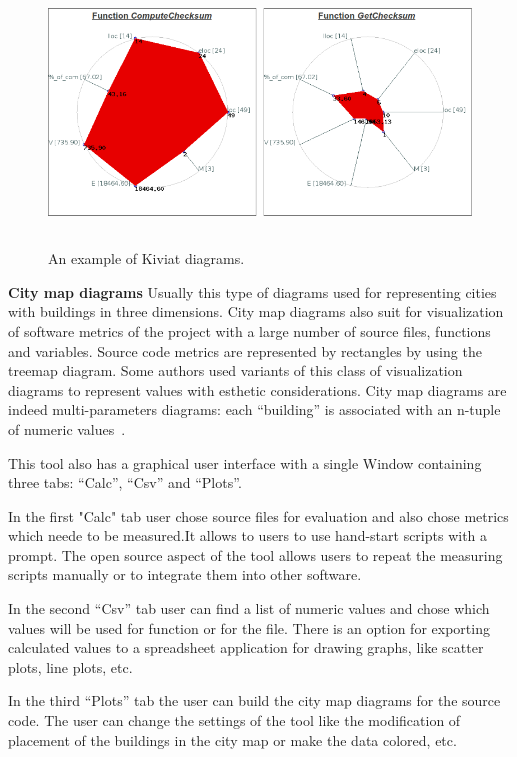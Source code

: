 \begin{figure}[h]
	\centering
	\includegraphics[height=70mm]{figures/metrix.png}
	\caption{An example of Kiviat diagrams.}
	\label{fig:metrix}
\end{figure}

\textbf{City map diagrams}
Usually this type of diagrams used for representing cities with buildings in three dimensions. City map diagrams also suit for visualization of software metrics of the project with a large number of source files, functions and variables. Source code metrics are represented by rectangles by using the treemap diagram. Some authors used variants of this class of visualization diagrams to represent  values with esthetic considerations. City map diagrams are indeed multi-parameters diagrams: each “building” is associated with an n-tuple of numeric values~\cite{metrix}.  

This tool also has a graphical user interface with a single Window containing three tabs: “Calc”, “Csv” and “Plots”.

In the first "Calc" tab user chose source files for evaluation and also chose metrics which neede to be measured.It allows to users to use  hand-start scripts with a prompt. The open source aspect of the tool allows users to repeat the measuring scripts manually or to integrate them into other software.

In the second “Csv” tab user can find a list of numeric values and chose which values will be used for function or for the file. There is an option for exporting calculated values to a spreadsheet application for drawing graphs, like scatter plots, line plots, etc.

In the third “Plots” tab the user can build the city map diagrams for the source code. The user can change the settings of the tool like the modification of placement of the buildings in the city map or make the data colored, etc.

